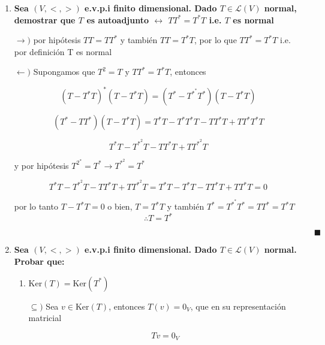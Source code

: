 \documentclass[12pt,a4paper]{article}
\begin{document}
\begin{enumerate}
    \item \textbf{Sea $(V,<,>)$ e.v.p.i finito dimensional. Dado $T \in \mathcal{L}(V)$ normal, demostrar que  $T$ es autoadjunto $\leftrightarrow$ $TT^{*}= T^{*}T$ i.e. $T$ es normal}
    
    $\rightarrow)$ por hipótesis $TT = T T^{*}$ y también $TT=T^{*}T$, por lo que $TT^{*}= T^{*}T$ i.e. por definición T es normal  
    
    $\leftarrow)$  Supongamos que $T^{2}=T$ y $TT^{*}=T^{*}T$, entonces
    
    \begin{equation*}
        (T-T^{*}T)^{*} (T-T^{*}T)= (T^{*}-T^{*}^{*}T^{*}) (T-T^{*}T) 
    \end{equation*}
    
    \begin{equation*}
        (T^{*}-TT^{*})(T-T^{*}T) = T^{*}T-T^{*}T^{*}T-TT^{*}T+TT^{*}T^{*}T
    \end{equation*}
    
    \begin{equation*}
        T^{*}T-T^{*}^{2}T-TT^{*}T+TT^{*}^{2}T
    \end{equation*}
    
    y por hipótesis $T^{2}^{*}=T^{*} \rightarrow T^{*}^{2}=T^{*}$
    
    \begin{equation*}
        T^{*}T-T^{*}^{2}T-TT^{*}T+TT^{*}^{2}T=T^{*}T-T^{*}T-TT^{*}T+TT^{*}T = 0
    \end{equation*}
    
    por lo tanto $T-T^{*}T=0$ o bien, $T=T^{*}T$ y también $T^{*}=T^{*}^{*}T^{*}= TT^{*}=T^{*}T$
    \begin{equation*}
        \therefore T=T^{*}
    \end{equation*}
    
    $\hspace{15cm} \blacksquare$
    
    \item \textbf{Sea $(V,<,>)$ e.v.p.i finito dimensional. Dado $T \in \mathcal{L}(V)$ normal. Probar que:}
    \begin{enumerate}
        \item $\text{Ker}(T)= \text{Ker}(T^{*})$
        
        
        $\subseteq)$ Sea $v \in \text{Ker}(T)$, entonces $T(v)= 0_V$, que en su representación matricial
        
        \begin{equation*}
            Tv = 0_V
        \end{equation*}
        

\end{enumerate}
\end{enumerate}
\end{document}
